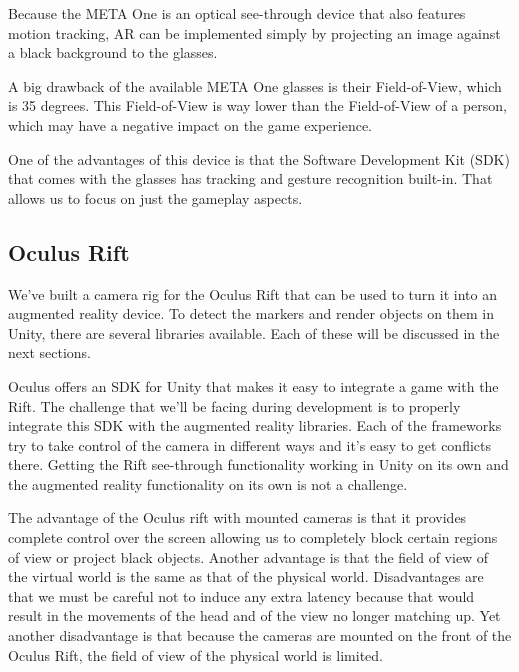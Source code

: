 			Because the META One is an optical see-through device that also
			features motion tracking, AR can be implemented simply by
			projecting an image against a black background to the glasses.

			A big drawback of the available META One glasses is their
			Field-of-View, which is 35 degrees. This Field-of-View is way lower
			than the Field-of-View of a person, which may have a negative impact
			on the game experience.

			One of the advantages of this device is that the Software
			Development Kit (SDK) that comes with the glasses has tracking and
			gesture recognition built-in. That allows us to focus on just the
			gameplay aspects.

		\subsection{Oculus Rift} \label{ssec:oculusrift}
			We've built a camera rig for the Oculus Rift that can be used to
			turn it into an augmented reality device. To detect the markers and
			render objects on them in Unity, there are several libraries
			available. Each of these will be discussed in the next sections.

			Oculus offers an SDK for Unity that makes it easy to integrate a
			game with the Rift. The challenge that we'll be facing during
			development is to properly integrate this SDK with the augmented
			reality libraries. Each of the frameworks try to take control of the
			camera in different ways and it's easy to get conflicts there.
			Getting the Rift see-through functionality working in Unity on its
			own and the augmented reality functionality on its own is not a
			challenge.

			The advantage of the Oculus rift with mounted cameras is that it
			provides complete control over the screen allowing us to completely
			block certain regions of view or project black objects. Another
			advantage is that the field of view of the virtual world is the same
			as that of the physical world. Disadvantages are that we must be
			careful not to induce any extra latency because that would result in
			the movements of the head and of the view no longer matching up. Yet
			another disadvantage is that because the cameras are mounted on the
			front of the Oculus Rift, the field of view of the physical world is
			limited.

